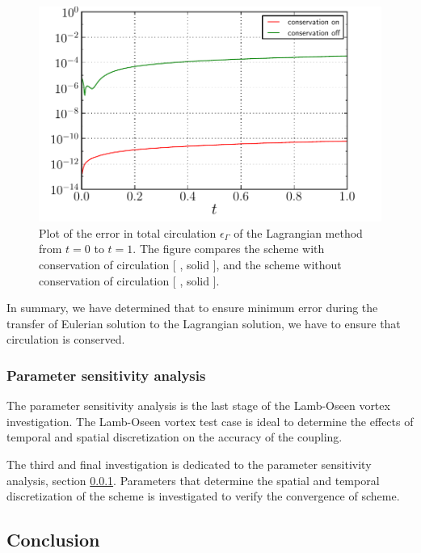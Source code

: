 	\begin{figure}[!h]
	\centering
	\includegraphics[width=0.6\linewidth]{./figures/hybrid/lambOseent2/lambOseen_comparision_conservation_circulation_compressed.pdf}
	\caption{Plot of the error in total circulation $\epsilon_{\Gamma}$ of the Lagrangian method from $t=0$ to $t=1$. The figure compares the scheme with conservation of circulation [ {\color{plotRed}{\textbf{---}}}, solid {}], and the scheme without conservation of circulation [ {\color{plotGreen}{\textbf{---}}}, solid {}].}
	\label{fig:lambOseen_comparision_conservation_circulation}
	\end{figure}	

In summary, we have determined that to ensure minimum error during the transfer of Eulerian solution to the Lagrangian solution, we have to ensure that circulation is conserved.

\subsubsection{Parameter sensitivity analysis}
\label{subsubsec:psa}

The parameter sensitivity analysis is the last stage of the Lamb-Oseen vortex investigation. The Lamb-Oseen vortex test case is ideal to determine the effects of temporal and spatial discretization on the accuracy of the coupling. 

The third and final investigation is dedicated to the parameter sensitivity analysis, section \ref{subsubsec:psa}. Parameters that determine the spatial and temporal discretization of the scheme is investigated to verify the convergence of scheme.



\subsection{Conclusion}



